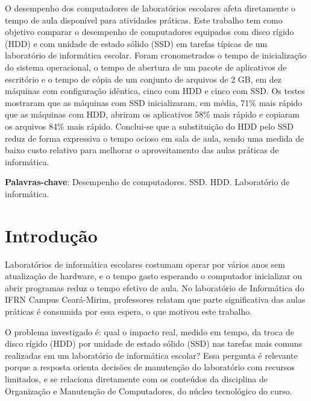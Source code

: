 \documentclass[article,12pt,a4paper]{abntex2}
\begin{document}
\maketitle
\thispagestyle{fancy}

\begin{resumo}
O desempenho dos computadores de laboratórios escolares afeta diretamente o
tempo de aula disponível para atividades práticas. Este trabalho tem como
objetivo comparar o desempenho de computadores equipados com disco rígido
(HDD) e com unidade de estado sólido (SSD) em tarefas típicas de um
laboratório de informática escolar. Foram cronometrados o tempo de
inicialização do sistema operacional, o tempo de abertura de um pacote de
aplicativos de escritório e o tempo de cópia de um conjunto de arquivos de
2 GB, em dez máquinas com configuração idêntica, cinco com HDD e cinco com
SSD. Os testes mostraram que as máquinas com SSD inicializaram, em média,
71\% mais rápido que as máquinas com HDD, abriram os aplicativos 58\% mais
rápido e copiaram os arquivos 84\% mais rápido. Conclui-se que a substituição
do HDD pelo SSD reduz de forma expressiva o tempo ocioso em sala de aula,
sendo uma medida de baixo custo relativo para melhorar o aproveitamento das
aulas práticas de informática.

\vspace{\onelineskip}
\noindent
\textbf{Palavras-chave}: Desempenho de computadores. SSD. HDD. Laboratório de informática.
\end{resumo}

\textual
\pagestyle{fancy}

\section{Introdução}

Laboratórios de informática escolares costumam operar por vários anos sem
atualização de hardware, e o tempo gasto esperando o computador inicializar
ou abrir programas reduz o tempo efetivo de aula. No laboratório de
Informática do IFRN Campus Ceará-Mirim, professores relatam que parte
significativa das aulas práticas é consumida por essa espera, o que motivou
este trabalho.

O problema investigado é: qual o impacto real, medido em tempo, da troca de
disco rígido (HDD) por unidade de estado sólido (SSD) nas tarefas mais
comuns realizadas em um laboratório de informática escolar? Essa pergunta é
relevante porque a resposta orienta decisões de manutenção do laboratório
com recursos limitados, e se relaciona diretamente com os conteúdos da
disciplina de Organização e Manutenção de Computadores, do núcleo
tecnológico do curso.
\end{document}
